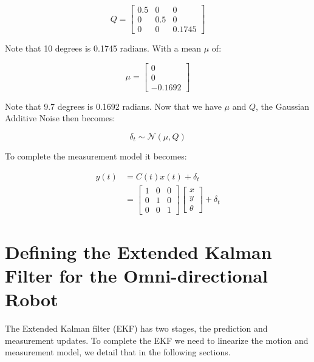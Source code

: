 \documentclass{article}
\begin{document}
\begin{equation}
	Q = 
	\begin{bmatrix}
		0.5 & 0 & 0 \\
		0 & 0.5 & 0 \\
		0 & 0 & 0.1745		
	\end{bmatrix}
\end{equation}

Note that 10 degrees is 0.1745 radians. With a mean $\mu$ of:

\begin{equation}
	\mu = 
	\begin{bmatrix}
		0 \\
		0 \\
		-0.1692 
	\end{bmatrix}
\end{equation}

Note that 9.7 degrees is 0.1692 radians. Now that we have $\mu$ and $Q$, the 
Gaussian Additive Noise then becomes:

\begin{equation}
	\delta_{t} \sim \mathcal{N} (\mu, Q)
\end{equation}

To complete the measurement model it becomes:

\begin{align}
	y(t) &= C(t) x(t) + \delta_{t} \\
	&=
	\begin{bmatrix}
		1 & 0 & 0 \\
		0 & 1 & 0 \\
		0 & 0 & 1
	\end{bmatrix}
	\begin{bmatrix}
		x \\
		y \\
		\theta 
	\end{bmatrix}
	+
	\delta_{t}
\end{align}




\newpage
\section{Defining the Extended Kalman Filter for the Omni-directional Robot}
\label{sec:ekf_defintion}

The Extended Kalman filter (EKF) has two stages, the prediction and measurement 
updates. To complete the EKF we need to linearize the motion and measurement 
model, we detail that in the following sections.
\end{document}
